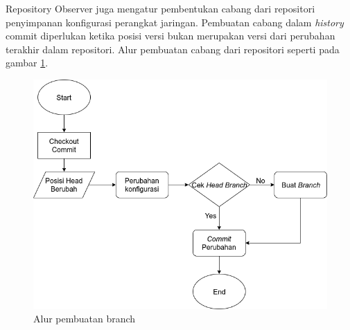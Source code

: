 	        \indent Repository Observer juga mengatur pembentukan cabang dari repositori penyimpanan konfigurasi perangkat jaringan. Pembuatan cabang dalam \textit{history} commit diperlukan ketika posisi versi bukan merupakan versi dari perubahan terakhir dalam repositori. Alur pembuatan cabang dari repositori seperti pada gambar \ref{CreateBranch}.
	        \begin{figure}[H]
	        	\centering
	        	\includegraphics[width=\textwidth]{Images/C-3/CreateBranch.png}
	        	\caption{Alur pembuatan branch}
	        	\label{CreateBranch}
	        \end{figure}
        
        
